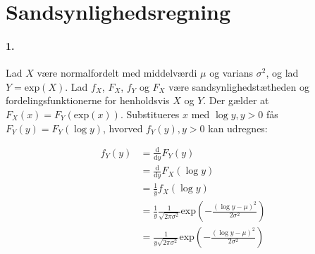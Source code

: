 \section{Sandsynlighedsregning}
\newcommand{\diff}[1]{\frac{\mathrm{d}}{\mathrm{d}#1}}

\paragraph{1.} Lad $X$ være normalfordelt med middelværdi $\mu$ og
varians $\sigma^2$, og lad $Y=\mathrm{exp}(X)$. Lad $f_X$, $F_X$, $f_Y$ og $F_X$ være
sandsynlighedstætheden og fordelingsfunktionerne for henholdsvis $X$ og $Y$. Der
gælder at $F_X(x) =
F_Y(\mathrm{exp}(x))$. Substitueres $x$ med $\log y, y > 0$
fås $F_Y(y) = F_Y(\log y)$, hvorved $f_Y(y), y > 0$ kan udregnes:

\begin{align*}
f_Y(y) &= \diff{y} F_Y(y) \\
&= \diff{y} F_X(\log y) \\
&= \frac{1}{y} f_X(\log y) \\
&= \frac{1}{y} \frac{1}{\sqrt{2\pi\sigma^2}}\mathrm{exp}\left( -\frac{(\log y - \mu)^2}{2\sigma^2} \right) \\ 
&= \frac{1}{y\sqrt{2\pi\sigma^2}}\mathrm{exp}\left( -\frac{(\log y - \mu)^2}{2\sigma^2} \right) 
\end{align*}
